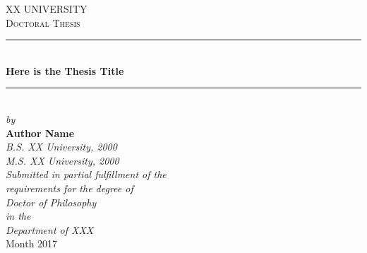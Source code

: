 \documentclass[12pt, oneside]{book}
\begin{document}
\raggedright %



\frontmatter %


\begin{titlepage}
   \begin{center}
       \textsc{\Large XX UNIVERSITY}\\[0.45cm] %
       \textsc{\large Doctoral Thesis}\\%
       \rule{\linewidth}{0.5mm}\\[0.25cm] %
       {\Large \bfseries Here is the Thesis Title}\\ %
       \rule{\linewidth}{0.45mm}\\
       \textit{by}\\
       {\textbf{\normalsize Author Name}}\\ %
       \textit{B.S. XX University, 2000}\\
       \textit{M.S. XX University, 2000}\\[0.45cm]
       \textit{Submitted in partial fulfillment of the \\requirements for the degree of\\ Doctor of Philosophy}\\%
       \textit{in the}\\
       \textit{Department of XXX}\\[0.45cm] %
       Month 2017\\[0.45cm] %
   \end{center}
\end{titlepage}
\end{document}
